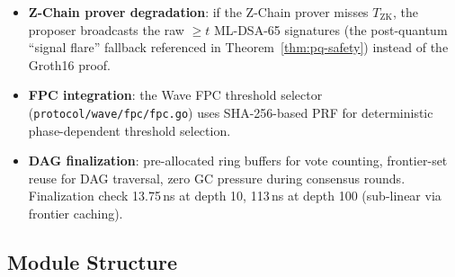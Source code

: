 \begin{itemize}[leftmargin=2em,nosep]
      (\texttt{requireRT = true}); the Mode\,2 fallback is governed by
      this flag and an out-of-band operator decision rather than an
      automatic in-protocol degradation. It does not degrade to
      BLS-only without explicit operator action.
\item \textbf{Z-Chain prover degradation}: if the Z-Chain prover misses
      $T_{\mathrm{ZK}}$, the proposer broadcasts the raw
      $\geq t$ ML-DSA-65 signatures (the post-quantum ``signal flare''
      fallback referenced in Theorem~\ref{thm:pq-safety}) instead of the
      Groth16 proof.
\item \textbf{FPC integration}: the Wave FPC threshold selector
      (\texttt{protocol/wave/fpc/fpc.go}) uses SHA-256-based PRF for
      deterministic phase-dependent threshold selection.
\item \textbf{DAG finalization}: pre-allocated ring buffers for vote
      counting, frontier-set reuse for DAG traversal, zero GC pressure
      during consensus rounds. Finalization check 13.75\,ns at depth 10,
      113\,ns at depth 100 (sub-linear via frontier caching).
\end{itemize}

\subsection{Module Structure}

